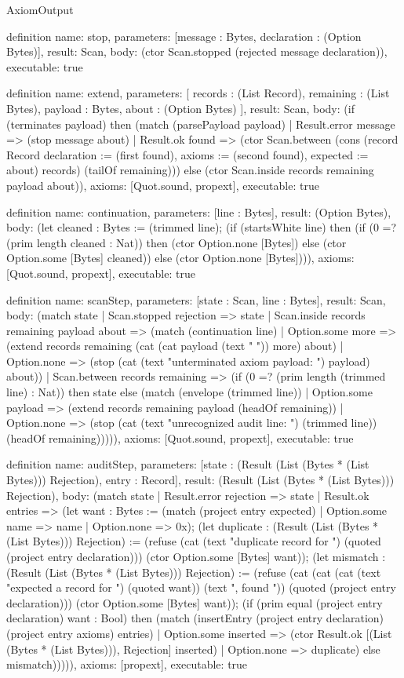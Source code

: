 \begin{lexlean}{AxiomOutput}
\begin{semanticmodule}
definition{
  name: stop,
  parameters: [message : Bytes, declaration : (Option Bytes)],
  result: Scan,
  body: (ctor Scan.stopped (rejected message declaration)),
  executable: true
}

definition{
  name: extend,
  parameters: [
    records : (List Record),
    remaining : (List Bytes),
    payload : Bytes,
    about : (Option Bytes)
  ],
  result: Scan,
  body: (if (terminates payload) then (match (parsePayload payload)
    | Result.error message => (stop message about)
    | Result.ok found => (ctor Scan.between (cons (record Record {declaration := (first found), axioms := (second found), expected := about}) records) (tailOf remaining))) else (ctor Scan.inside records remaining payload about)),
  axioms: [Quot.sound, propext],
  executable: true
}

definition{
  name: continuation,
  parameters: [line : Bytes],
  result: (Option Bytes),
  body: (let cleaned : Bytes := (trimmed line); (if (startsWhite line) then (if (0 =? (prim length cleaned : Nat)) then (ctor Option.none [Bytes]) else (ctor Option.some [Bytes] cleaned)) else (ctor Option.none [Bytes]))),
  axioms: [Quot.sound, propext],
  executable: true
}

definition{
  name: scanStep,
  parameters: [state : Scan, line : Bytes],
  result: Scan,
  body: (match state
    | Scan.stopped rejection => state
    | Scan.inside records remaining payload about => (match (continuation line)
      | Option.some more => (extend records remaining (cat (cat payload (text " ")) more) about)
      | Option.none => (stop (cat (text "unterminated axiom payload: ") payload) about))
    | Scan.between records remaining => (if (0 =? (prim length (trimmed line) : Nat)) then state else (match (envelope (trimmed line))
      | Option.some payload => (extend records remaining payload (headOf remaining))
      | Option.none => (stop (cat (text "unrecognized audit line: ") (trimmed line)) (headOf remaining))))),
  axioms: [Quot.sound, propext],
  executable: true
}

definition{
  name: auditStep,
  parameters: [state : (Result (List (Bytes * (List Bytes))) Rejection), entry : Record],
  result: (Result (List (Bytes * (List Bytes))) Rejection),
  body: (match state
    | Result.error rejection => state
    | Result.ok entries => (let want : Bytes := (match (project entry expected)
      | Option.some name => name
      | Option.none => 0x); (let duplicate : (Result (List (Bytes * (List Bytes))) Rejection) := (refuse (cat (text "duplicate record for ") (quoted (project entry declaration))) (ctor Option.some [Bytes] want)); (let mismatch : (Result (List (Bytes * (List Bytes))) Rejection) := (refuse (cat (cat (cat (text "expected a record for ") (quoted want)) (text ", found ")) (quoted (project entry declaration))) (ctor Option.some [Bytes] want)); (if (prim equal (project entry declaration) want : Bool) then (match (insertEntry (project entry declaration) (project entry axioms) entries)
      | Option.some inserted => (ctor Result.ok [(List (Bytes * (List Bytes))), Rejection] inserted)
      | Option.none => duplicate) else mismatch))))),
  axioms: [propext],
  executable: true
}


\end{semanticmodule}
\end{lexlean}
